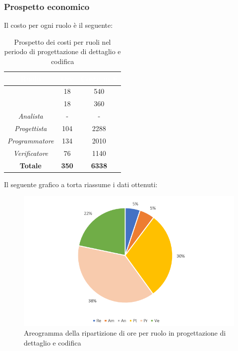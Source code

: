 \subsubsection{Prospetto economico}
Il costo per ogni ruolo è il seguente:
\begin{table}[H]
	\begin{center}
		\begin{tabular}{ |c c c| }
		\rowcolor{darkblue} 
		\textcolor{white}{\textbf{Ruolo}} & \textcolor{white}{\textbf{Ore}} & \textcolor{white}{\textbf{Costo in €}}\\ \hline
		{\Responsabile} 			& 18 	& 540 \\ \hline
		{\Amministratore}		 	& 18 	& 360 \\ \hline
		\textit{Analista} 			& - 	& - \\ \hline
		\textit{Progettista} 		& 104 	& 2288 \\ \hline
		\textit{Programmatore}  	& 134 	& 2010 \\ \hline
		\textit{Verificatore} 		& 76 	& 1140 \\ \hline
		\textbf{Totale} & \textbf{350} & \textbf{6338} \\ \hline
		\end{tabular}
	\caption{Prospetto dei costi per ruoli nel periodo di progettazione di dettaglio e codifica}
	\end{center}
\end{table}
Il seguente grafico a torta riassume i dati ottenuti:
\begin{figure}[H]
    \centering
    \includegraphics[scale = 0.75]{Immagini/DettaglioTorta.png}
    \caption{Areogramma della ripartizione di ore per ruolo in progettazione di dettaglio e codifica}
    \label{fig:Areogramma ripartizione ore, periodo di Progettazione di Dettaglio e Codifica}
\end{figure}
\newpage
